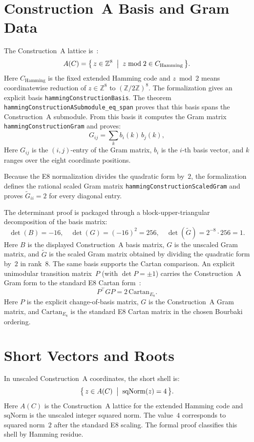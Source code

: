 \documentclass[12pt]{article}
\theoremstyle{definition}
\newcommand{\Z}{\mathbb{Z}}
\newcommand{\lean}[1]{\texttt{#1}}
\begin{document}
\section{Construction~A Basis and Gram Data}
\label{app:gram}

The Construction~A lattice is~\cite{LeechSloane1971,ConwaySloane1999}:
\[
  A(C) = \bigl\{\, z \in \Z^8 \;\bigm|\; z \bmod 2 \in C_{\mathrm{Hamming}} \,\bigr\}.
\]
Here \(C_{\mathrm{Hamming}}\) is the fixed extended Hamming code and
\(z\bmod 2\) means coordinatewise reduction of \(z\in\Z^8\) to
\((\Z/2\Z)^8\).
The formalization gives an explicit basis \lean{hammingConstructionBasis}.
The theorem \lean{hammingConstructionASubmodule\_eq\_span} proves that this
basis spans the Construction~A submodule.  From this basis it computes the Gram
matrix \lean{hammingConstructionGram} and proves:
\[
  G_{ij} = \sum_{k} b_i(k)\,b_j(k),
\]
Here \(G_{ij}\) is the \((i,j)\)-entry of the Gram matrix, \(b_i\) is the
\(i\)-th basis vector, and \(k\) ranges over the eight coordinate positions.

Because the E8 normalization divides the quadratic form by~$2$, the
formalization defines the rational scaled Gram matrix
\lean{hammingConstructionScaledGram} and proves $\tilde{G}_{ii} = 2$ for every
diagonal entry.

The determinant proof is packaged through a block-upper-triangular decomposition
of the basis matrix:
\[
  \det(B) = -16, \quad \det(G) = (-16)^2 = 256, \quad
  \det(\tilde{G}) = 2^{-8}\cdot 256 = 1.
\]
Here \(B\) is the displayed Construction~A basis matrix, \(G\) is the unscaled
Gram matrix, and \(\tilde{G}\) is the scaled Gram matrix obtained by dividing
the quadratic form by~\(2\) in rank~\(8\).
The same basis supports the Cartan comparison.  An explicit unimodular
transition matrix~$P$ (with $\det P = \pm 1$) carries the Construction~A Gram
form to the standard E8 Cartan form~\cite{Bourbaki2002,ConwaySloane1999}:
\[
  P^\top G P = 2\,\mathrm{Cartan}_{E_8}.
\]
Here \(P\) is the explicit change-of-basis matrix, \(G\) is the Construction~A
Gram matrix, and \(\mathrm{Cartan}_{E_8}\) is the standard E8 Cartan matrix in
the chosen Bourbaki ordering.

\section{Short Vectors and Roots}
\label{app:roots}

In unscaled Construction~A coordinates, the short shell is:
\[
  \bigl\{\, z \in A(C) \;\bigm|\; \mathrm{sqNorm}(z) = 4 \,\bigr\}.
\]
Here \(A(C)\) is the Construction~A lattice for the extended Hamming code and
\(\mathrm{sqNorm}\) is the unscaled integer squared norm.  The value~\(4\)
corresponds to squared norm~\(2\) after the standard E8 scaling.
The formal proof classifies this shell by Hamming residue.
\end{document}

